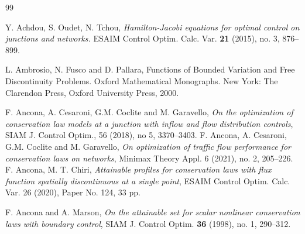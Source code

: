 \documentclass[a4paper, 10pt, final]{article}
\begin{document}
%
%  
\begin{thebibliography}{99}


   Y. Achdou, S. Oudet, N.  Tchou, 
  \textsl{Hamilton-Jacobi equations for optimal control on junctions and networks. }
ESAIM Control Optim. Calc. Var.  \textbf{21} (2015), no. 3, 876--899. 




  

 L. Ambrosio, N. Fusco and D. Pallara, Functions of Bounded Variation and Free Discontinuity Problems. Oxford
Mathematical Monographs. New York: The Clarendon Press, Oxford University Press, 2000.

 F. Ancona, A. Cesaroni, G.M.  Coclite and M. Garavello,
\textsl{On the optimization of conservation law models at a junction with inflow and flow distribution controls},   
SIAM J. Control Optim.,  56 (2018), no 5, 3370--3403.
%
 F. Ancona, A. Cesaroni, G.M.  Coclite and M. Garavello,
\textsl{On optimization of traffic flow performance for conservation laws on networks}, Minimax Theory Appl. 6 (2021), no. 2, 205–226. 
%
F. Ancona,  M. T. Chiri,  \textsl{Attainable profiles for conservation laws with flux function spatially discontinuous at a single point}, 
 ESAIM Control Optim. Calc. Var. 26 (2020), Paper No. 124, 33 pp.

 

 F. Ancona and A. Marson, \textsl{On the attainable set for
   scalar nonlinear conservation laws with boundary control}, SIAM
 J. Control Optim. \textbf{36} (1998), no. 1, 290--312.
%


\end{thebibliography}
\end{document}
